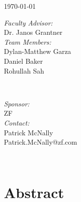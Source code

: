 \documentclass[12pt]{article}
\begin{document}
\begin{titlepage}
    {\large \today}\\[1cm] 
    
    
    \begin{minipage}{0.4\textwidth}
        \begin{flushleft} \large
            \emph{Faculty Advisor:}\\
            Dr. Janos Grantner\\ [.25cm]
        \emph{Team Members:}\\
        Dylan-Matthew Garza\\
        Daniel Baker\\
        Rohullah Sah
        \end{flushleft}
    \end{minipage}
    ~
    \begin{minipage}{0.4\textwidth}
        \begin{flushright} \large
            \emph{Sponsor:} \\
            ZF
            \\\emph{Contact:}\\
            Patrick McNally\\ 
            Patrick.McNally@zf.com
        \end{flushright}
    \end{minipage}\\[1cm]
    
    
    \begin{flushleft} \large
    \end{flushleft}
    
    \vfill 
    
\end{titlepage}

\tableofcontents
\newpage
\section{Abstract}
\end{document}
